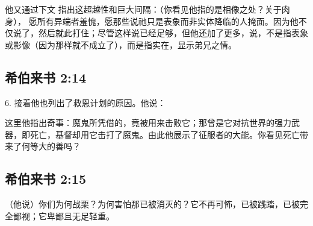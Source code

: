 他又通过下文  指出这超越性和巨大间隔：（你看见他指的是相像之处？关于肉身）， 愿所有异端者羞愧，愿那些说祂只是表象而非实体降临的人掩面。因为他不仅说了，然后就此打住；尽管这样说已经足够，但他还加了更多，说，不是指表象或影像（因为那样就不成立了），而是指实在，显示弟兄之情。\par


\subsection{希伯来书 2:14}

6. 接着他也列出了救恩计划的原因。他说：\par

这里他指出奇事：魔鬼所凭借的，竟被用来击败它；那曾是它对抗世界的强力武器，即死亡，基督却用它击打了魔鬼。由此他展示了征服者的大能。你看见死亡带来了何等大的善吗？\par


\subsection{希伯来书 2:15}

（他说）你们为何战栗？为何害怕那已被消灭的？它不再可怖，已被践踏，已被完全鄙视；它卑鄙且无足轻重。 \par

